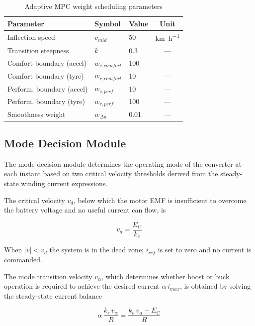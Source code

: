 \begin{table}[H]
\centering
\caption{Adaptive MPC weight scheduling parameters}
\label{tab:scheduling_params}
\renewcommand{\arraystretch}{1.3}
\begin{tabular}{lllc}
\toprule 
Parameter & Symbol & Value & Unit \\
\midrule 
Inflection speed         & $v_{mid}$        & 50    & \si{\kilo\metre\per\hour} \\
Transition steepness     & $k$              & 0.3   & --- \\
Comfort boundary (accel) & $w_{c,comfort}$  & 100   & --- \\
Comfort boundary (tyre)  & $w_{r,comfort}$  & 10    & --- \\
Perform. boundary (accel)& $w_{c,perf}$     & 10    & --- \\
Perform. boundary (tyre) & $w_{r,perf}$     & 100   & --- \\
Smoothness weight        & $w_{\Delta u}$   & 0.01  & --- \\
\bottomrule 
\end{tabular}
\end{table}


\subsection{Mode Decision Module}
\label{subsec:mode}

The mode decision module determines the operating mode of the
converter at each instant based on two critical velocity thresholds
derived from the steady-state winding current expressions.

The critical velocity $v_d$, below which the motor EMF is insufficient
to overcome the battery voltage and no useful current can flow, is

\begin{equation}
    v_d = \frac{E_C}{k_e}
    \label{eq:vd}
\end{equation}

When $|v| < v_d$ the system is in the dead zone; $i_{ref}$ is set to
zero and no current is commanded.

The mode transition velocity $v_\alpha$, which determines whether boost
or buck operation is required to achieve the desired current $\alpha\,i_{max}$,
is obtained by solving the steady-state current balance

\begin{equation}
    \alpha\,\frac{k_e\,v_\alpha}{R} = \frac{k_e\,v_\alpha - E_C}{R}
    \label{eq:valpha_eq}
\end{equation}


